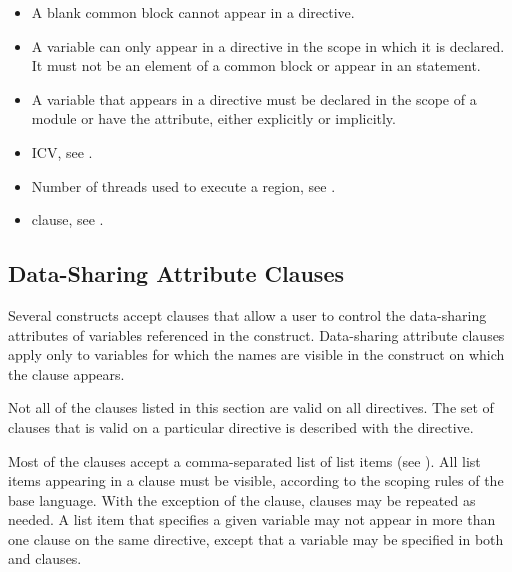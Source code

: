 {{{{\begin{itemize}
\item A blank common block cannot appear in a  directive.

\item A variable can only appear in a  directive in the scope in which it 
is declared. It must not be an element of a common block or appear in an 
 statement.

\item A variable that appears in a  directive must be declared in the 
scope of a module or have the  attribute, either explicitly or implicitly.
\end{itemize} %
\fortranspecificend

\crossreferences
\begin{itemize}
\item {} ICV, see 
.

\item Number of threads used to execute a  region, see 
.

\item {} clause, see 
.
\end{itemize}








\subsection{Data-Sharing Attribute Clauses}
\label{subsec:Data-Sharing Attribute Clauses}
Several constructs accept clauses that allow a user to control the data-sharing attributes 
of variables referenced in the construct. Data-sharing attribute clauses apply only to 
variables for which the names are visible in the construct on which the clause appears.

Not all of the clauses listed in this section are valid on all directives. The set of clauses 
that is valid on a particular directive is described with the directive.

Most of the clauses accept a comma-separated list of list items (see 
). 
All list items appearing in a clause must be visible, according to the scoping rules 
of the base language. With the exception of the  clause, clauses may be 
repeated as needed. A list item that specifies a given variable may not appear in more 
than one clause on the same directive, except that a variable may be specified in both 
 and  clauses.

}}}}
